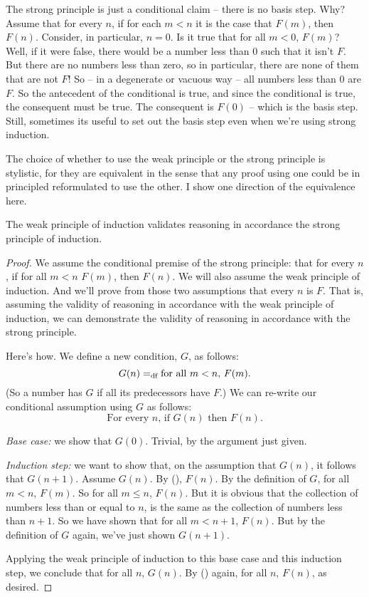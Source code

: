 The strong principle is just a conditional claim – there is no basis step. Why? Assume that for every $n$, if for each $m < n$ it is the case that $F(m)$, then $F(n)$. Consider, in particular, $n=0$. Is it true that for all $m <0$, $F(m)$? Well, if it were false, there would be a number less than $0$ such that it isn't $F$. But there are no numbers less than zero, so in particular, there are none of them that are not $F$! So – in a degenerate or vacuous way – all numbers less than $0$ are $F$. So the antecedent of the conditional is true, and since the conditional is true, the consequent must be true. The consequent is $F(0)$ – which is the basis step. Still, sometimes its useful to set out the basis step even when we're using strong induction.

The choice of whether to use the weak principle or the strong principle is stylistic, for they are equivalent in the sense that any proof using one could be in principled reformulated to use the other. I show one direction of the equivalence here.
\begin{theorem} The weak principle of induction validates reasoning in accordance the strong principle of induction.
  \begin{proof}
    We assume the conditional premise of the strong principle: that for every $n$, if for all $m < n$ $F(m)$, then $F(n)$. We will also assume the weak principle of induction. And we'll prove from those two assumptions that every $n$ is $F$. That is, assuming the validity of reasoning in accordance with the weak principle of induction, we can demonstrate the validity of reasoning in accordance with the strong principle.

    Here's how. We define a new condition, $G$, as follows: $$G(n) =_{\text{df}} \text{for all $m < n$, $F(m)$}.$$ (So a number has $G$ if all its predecessors have $F$.) We can re-write our conditional assumption using $G$ as follows: \begin{equation*}\tag{\dag}
      \text{For every $n$, if $G(n)$ then $F(n)$.}
    \end{equation*}

    \emph{Base case:} we show that $G(0)$. Trivial, by the argument just given.

    \emph{Induction step:} we want to show that, on the assumption that $G(n)$, it follows that $G(n+1)$. Assume $G(n)$. By (\dag), $F(n)$. By the definition of $G$, for all $m<n$, $F(m)$. So for all $m\leqslant n$, $F(n)$. But it is obvious that the collection of numbers less than or equal to $n$, is the same as the collection of numbers less than $n+1$. So we have shown that  for all $m< n+1$, $F(n)$. But by the definition of $G$ again, we've just shown $G(n+1)$. 

    Applying the weak principle of induction to this base case and this induction step, we conclude that for all $n$, $G(n)$. By (\dag) again, for all $n$, $F(n)$, as desired.
  \end{proof}
\end{theorem}



